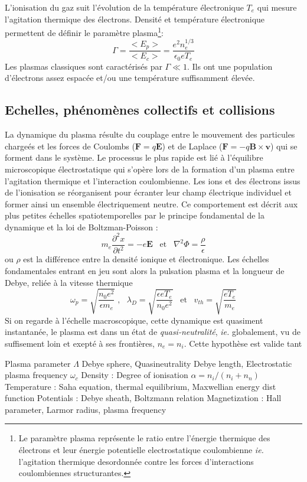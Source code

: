 			L'ionisation du gaz suit l'évolution de la température électronique $T_e$ qui
			mesure l'agitation thermique des électrons. Densité et température
			électronique permettent de définir le paramètre plasma\footnote{Le
			paramètre plasma représente le ratio entre l'énergie thermique des électrons
			et leur énergie potentielle electrostatique coulombienne \emph{ie.}
			l'agitation thermique desordonnée contre les forces d'interactions
			coulombiennes structurantes.}:
				$$\Gamma=\frac{<E_p>}{<E_c>}=\frac{e^2n_e^{1/3}}{\epsilon_0 eT_e}$$
			Les plasmas classiques sont caractérisés par $\Gamma\ll 1$. Ils ont une
			population d'électrons assez espacée et/ou une température suffisamment élevée. 
			
		\subsection{Echelles, phénomènes collectifs et collisions}
		La dynamique du plasma résulte du couplage entre le mouvement des particules chargeés et les forces 
		de Coulombs ($\mathbf F=q\mathbf E$) et de Laplace ($\mathbf F=-q\mathbf
			B\times\mathbf v$) qui se forment dans le système. Le processus le plus rapide est lié à l'équilibre
			microscopique électrostatique qui s'opère lors de la formation d'un plasma entre l'agitation thermique et 
			l'interaction coulombienne. Les ions et des électrons
			issus de l'ionisation se réorganisent pour écranter leur champ
			électrique individuel et former ainsi un ensemble électriquement neutre. 
			Ce comportement est décrit aux plus petites échelles spatiotemporelles par le principe fondamental de 
			la dynamique et la loi de Boltzman-Poisson :
			$$m_e\frac{\partial^2 x}{\partial t^2}=-e\mathbf E \;\;\;\text{et}\;\;\;\nabla^2\Phi=\frac{\rho}{\epsilon}$$ 
			ou $\rho$ est la différence entre la densité ionique et électronique.
			Les échelles fondamentales entrant en jeu sont alors la pulsation plasma et la longueur de Debye, 
			reliée à la vitesse thermique 
			$$\omega_p=\sqrt{\frac{n_0e^2}{\epsilon m_e}}\;\text{,}\;\;\;\lambda_D=\sqrt{\frac{\epsilon eT_e}{n_0e^2}}\;\;\;\text{et}\;\;\;v_{th}=\sqrt{\frac{eT_e}{m_e}}$$
			Si on regarde à l'échelle macroscopique, cette dynamique est quasiment instantanée,
			le plasma est dans un état de \emph{quasi-neutralité}, 
			\emph{ie.} globalement, vu de suffisement loin et exepté à ses frontières, $n_e=n_i$. Cette hypothèse 
			est valide tant 
			
		 Plasma parameter $\Lambda$ Debye sphere, Quasineutrality Debye length,
		Electrostatic plasma frequency $\omega_c$
		 Density : Degree of ionisation $\alpha=n_i/(n_i+n_n)$
			Temperature : Saha equation, thermal equilibrium, Maxwellian energy dist function
			Potentials : Debye sheath, Boltzmann relation
			Magnetization : Hall parameter, Larmor radius, plasma frequency
		
